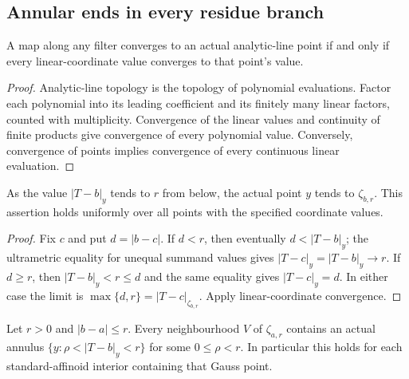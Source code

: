 \subsection{Annular ends in every residue branch}\label{subsec:fc-line-ends}

\begin{lemma}\label{lem:fc-linear-convergence}
\leanok
{}
A map along any filter converges to an actual analytic-line point if and
only if every linear-coordinate value converges to that point's value.
\end{lemma}

\begin{proof}
Analytic-line topology is the topology of polynomial evaluations. Factor
each polynomial into its leading coefficient and its finitely many linear
factors, counted with multiplicity. Convergence of the linear values and
continuity of finite products give convergence of every polynomial value.
Conversely, convergence of points implies convergence of every continuous
linear evaluation.
\end{proof}

\begin{lemma}\label{lem:fc-branch-end-convergence}
\leanok
{}
As the value $|T-b|_y$ tends to $r$ from below, the actual point $y$ tends
to $\zeta_{b,r}$. This assertion holds uniformly over all points with the
specified coordinate values.
\end{lemma}

\begin{proof}
Fix $c$ and put $d=|b-c|$. If $d<r$, then eventually $d<|T-b|_y$;
the ultrametric equality for unequal summand values gives
$|T-c|_y=|T-b|_y\to r$. If $d\ge r$, then $|T-b|_y<r\le d$ and the
same equality gives $|T-c|_y=d$. In either case the limit is
$\max\{d,r\}=|T-c|_{\zeta_{b,r}}$. Apply linear-coordinate convergence.
\end{proof}

\begin{theorem}\label{thm:fc-residue-end-annulus}
\leanok
{}
Let $r>0$ and $|b-a|\le r$. Every neighbourhood $V$ of $\zeta_{a,r}$
contains an actual annulus
$\{y:\rho<|T-b|_y<r\}$ for some $0\le\rho<r$.
In particular this holds for each standard-affinoid interior containing
that Gauss point.
\end{theorem}

